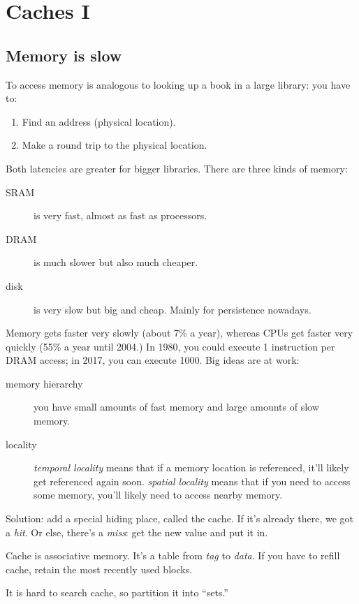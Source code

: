 \chapter{Caches I}
\section{Memory is slow}
To access memory is analogous to looking up a book in a large library: you have to:
\begin{enumerate}
	\item Find an address (physical location).
	\item Make a round trip to the physical location.
\end{enumerate}
Both latencies are greater for bigger libraries.
There are three kinds of memory:
\begin{description}
	\item[SRAM] is very fast, almost as fast as processors.
	\item[DRAM] is much slower but also much cheaper.
	\item[disk] is very slow but big and cheap. Mainly for persistence nowadays.
\end{description}

Memory gets faster very slowly (about 7\% a year), whereas CPUs get faster very quickly (55\% a year until 2004.)
In 1980, you could execute 1 instruction per DRAM access;
in 2017, you can execute 1000.
Big ideas are at work:
\begin{description}
	\item[memory hierarchy] you have small amounts of fast memory and large amounts of slow memory.
	\item[locality] \emph{temporal locality} means that if a memory location is referenced, it'll likely get referenced again soon. \emph{spatial locality} means that if you need to access some memory, you'll likely need to access nearby memory.
\end{description}

Solution: add a special hiding place, called the cache.
If it's already there, we got a \emph{hit}.
Or else, there's a \emph{miss}: get the new value and put it in.

Cache is associative memory. It's a table from \emph{tag} to \emph{data}. If you have to refill cache,
retain the most recently used blocks.

It is hard to search cache, so partition it into ``sets.''
